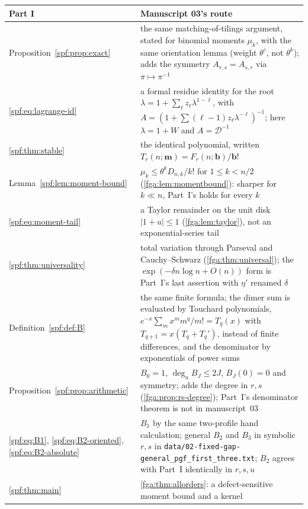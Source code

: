 \documentclass[11pt]{article}
\numberwithin{equation}{section}
\theoremstyle{definition}
\theoremstyle{remark}
\theoremstyle{definition}
\newcommand{\bfac}{\mathbf b!}
\begin{document}
\begin{table}[htbp]
\centering\small
\renewcommand{\arraystretch}{1.12}
\begin{tabular}{@{}>{\raggedright\arraybackslash}p{}>{\raggedright\arraybackslash}p{}@{}}
\toprule
Part I & Manuscript 03's route\\
\midrule
Proposition~\ref{spf:prop:exact} &
the same matching-of-tilings argument, stated for binomial moments $\mu_k$,
with the same orientation lemma (weight $\theta^c$, not $\theta^k$); adds
the symmetry $A_{r,s}=A_{s,r}$ via $\pi\mapsto\pi^{-1}$\\
\eqref{spf:eq:lagrange-id} &
a formal residue identity for the root $\lambda=1+\sum_\ell
z_\ell\lambda^{1-\ell}$, with $A=(1+\sum(\ell-1)z_\ell\lambda^{-\ell})^{-1}$;
here $\lambda=1+W$ and $A=\mathcal D^{-1}$\\
\cref{spf:thm:stable} &
the identical polynomial, written $T_r(n;\mathbf m)=F_r(n;\mathbf b)/\bfac$\\
Lemma~\ref{spf:lem:moment-bound} &
$\mu_k\le\theta^kD_{n,k}/k!$ for $1\le k<n/2$ (\cref{fga:lem:momentbound}):
sharper for $k\ll n$, Part~I's holds for every $k$\\
\eqref{spf:eq:moment-tail} &
a Taylor remainder on the unit disk $|1+u|\le1$ (\cref{fga:lem:taylor}),
not an exponential-series tail\\
\cref{spf:thm:universality} &
total variation through Parseval and Cauchy--Schwarz
(\cref{fga:thm:universal}); the $\exp(-\delta n\log n+O(n))$ form is
Part~I's last assertion with $\eta'$ renamed $\delta$\\
Definition~\ref{spf:def:B} &
the same finite formula; the dimer sum is evaluated by Touchard polynomials,
$e^{-x}\sum_mx^mm^q/m!=T_q(x)$ with $T_{q+1}=x(T_q+T_q')$, instead of
finite differences, and the denominator by exponentials of power sums\\
Proposition~\ref{spf:prop:arithmetic} &
$B_0=1$, $\deg_uB_J\le2J$, $B_J(0)=0$ and symmetry; adds the degree in
$r,s$ (\cref{fga:prop:rs-degree}); Part~I's denominator theorem is not in
manuscript~03\\
\eqref{spf:eq:B1}, \eqref{spf:eq:B2-oriented}, \eqref{spf:eq:B2-absolute} &
$B_1$ by the same two-profile hand calculation; general $B_2$ and $B_3$ in
symbolic $r,s$ in \nolinkurl{data/02-fixed-gap-general_pgf_first_three.txt};
$B_2$ agrees with Part~I identically in $r,s,u$\\
\cref{spf:thm:main} &
\cref{fga:thm:allorders}: a defect-sensitive moment bound and a kernel

\end{tabular}
\end{table}
\end{document}
